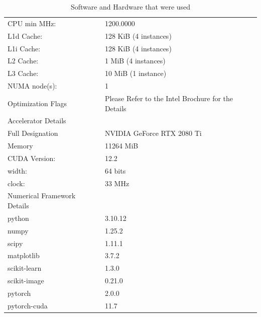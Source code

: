 {\begin{table}
\begin{tabular}{||l l||}
     CPU min MHz:                 & 1200.0000                                         	  	\\
     L1d Cache:                   & 128 KiB (4 instances)                           	    	\\
     L1i Cache:                   & 128 KiB (4 instances) 	 	                              \\
     L2 Cache:                    & 1 MiB (4 instances) 	                                 	\\
     L3 Cache:                    & 10 MiB (1 instance) 	 	                                \\
     NUMA node(s):                & 1                                               	 	    \\
     Optimization Flags           & Please Refer to the Intel Brochure for the Details  		\\[1ex] 
     \hline
     \hline
     Accelerator Details 			    &  					                                            	\\[0.5ex] 
     \hline\hline
     Full Designation 	    			& NVIDIA GeForce RTX 2080 Ti 	                            \\ 
     Memory   	              		& 11264 MiB 	                                           	\\
     CUDA Version:                & 12.2  	                                               	\\
     width:                       & 64 bits                                                 \\
     clock:                       & 33 MHz 	                                                \\[1ex] 
     \hline
     \hline
     Numerical Framework Details	&  				                                            		\\[0.5ex] 
     \hline\hline
     python                       & 3.10.12                                                 \\
     numpy                        & 1.25.2  		                                            \\
     scipy                        & 1.11.1  		                                            \\
     matplotlib                   & 3.7.2   		                                            \\
     scikit-learn                 & 1.3.0  		                                              \\
     scikit-image                 & 0.21.0  		                                            \\
     pytorch                      & 2.0.0			 			 	                                      \\ 
     pytorch-cuda                 & 11.7 	 	                                                \\[1ex] 
     \hline
    \end{tabular}
    \caption{Software and Hardware that were used}
    \end{table}
  \clearpage %
}


